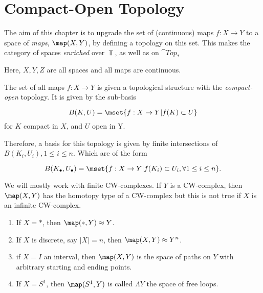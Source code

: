 \documentclass[main.tex]{subfiles}
\begin{document}
\chapter{Compact-Open Topology}

The aim of this chapter is to upgrade the set of (continuous) maps \(f: X \to Y\) to a space of \emph{maps}, \(\map(X,Y)\), by defining a topology on this set.
This makes the category of spaces \emph{enriched} over \(\Top\), as well as on \(\cat{Top_*}\)

\begin{rem}
	Here, \(X, Y, Z\) are all spaces and all maps are continuous.
\end{rem}

\begin{defn}
	The set of all maps \(f: X \to Y\) is given a topological structure with the \emph{compact-open} topology.
	It is given by the sub-basis
	
\[
		B(K, U) = \mset{f: X \to Y | f(K) \subset U}
	
\]
	for \(K\) compact in \(X\), and \(U\) open in Y.
\end{defn}

\begin{rem}
	Therefore, a basis for this topology is given by finite intersections of \(B(K_i, U_i), 1 \leq i \leq n\).
	Which are of the form
	
\[
		B(K_\bullet, U_\bullet) = \mset{f: X \to Y | f(K_i) \subset U_i, \forall 1 \leq i \leq n}.
	
\]
\end{rem}

\begin{rem}
	We will mostly work with finite CW-complexes.
	If \(Y\) is a CW-complex, then \(\map(X,Y)\) has the homotopy type of a CW-complex but this is not true if \(X\) is an infinite CW-complex.

\end{rem}

\begin{example}
	
\begin{enumerate}
		\item If \(X = \ast\), then \(\map(\ast, Y) \approx Y\).
		\item If \(X\) is discrete, say \(|X| = n\), then \(\map(X,Y) \approx Y^n \).
		\item if \(X = I\) an interval, then \(\map(X,Y)\) is the space of paths on \(Y\) with arbitrary starting and ending points.
		\item If \(X = S^1 \), then \(\map(S^1, Y)\) is called \(\Lambda Y\) the space of free loops.
	
\end{enumerate}
\end{example}
\end{document}
